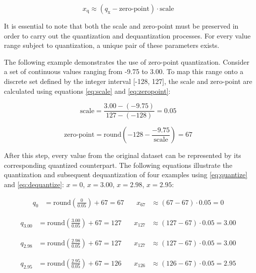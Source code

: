 {\begin{equation}
x_{\text{q}} \approx \left( q_{\text{x}} - \text{zero-point} \right) \cdot \text{scale}
\label{eq:dequantize}
\end{equation}

It is essential to note that both the scale and zero-point must be preserved in order to carry out the quantization and dequantization processes.
For every value range subject to quantization, a unique pair of these parameters exists.

The following example demonstrates the use of zero-point quantization. Consider a set of continuous values ranging from -9.75 to 3.00.
To map this range onto a discrete set defined by the integer interval [-128, 127], the scale and zero-point are calculated using equations \ref{eq:scale} and \ref{eq:zeropoint}:

\begin{equation*}
\text{scale} = \frac{3.00 - (-9.75)}{127 - (-128)} = 0.05
\end{equation*}

\begin{equation*}
\text{zero-point} = \text{round}\left( -128 - \frac{-9.75}{\text{scale}} \right) = 67
\end{equation*}


After this step, every value from the original dataset can be represented by its corresponding quantized counterpart.
The following equations illustrate the quantization and subsequent dequantization of four examples using \ref{eq:quantize} and \ref{eq:dequantize}:
\( x = 0 \), \( x = 3.00 \), \( x = 2.98 \), \( x = 2.95 \):

\begin{align*}
q_{0} &= \text{round}\left(\frac{0}{0.05} \right) + 67 = 67
& \quad
x_{67} &\approx \left( 67 - 67 \right) \cdot 0.05 = 0
\end{align*}

\begin{align*}
q_{3.00} &= \text{round}\left(\frac{3.00}{0.05} \right) + 67 = 127
& \quad
x_{127} &\approx \left( 127 - 67 \right) \cdot 0.05 = 3.00
\end{align*}

\begin{align*}
q_{2.98} &= \text{round}\left(\frac{2.98}{0.05} \right) + 67 = 127
& \quad
x_{127} &\approx \left( 127 - 67 \right) \cdot 0.05 = 3.00
\end{align*}

\begin{align*}
q_{2.95} &= \text{round}\left(\frac{2.95}{0.05} \right) + 67 = 126
& \quad
x_{126} &\approx \left( 126 - 67 \right) \cdot 0.05 = 2.95
\end{align*}

}
